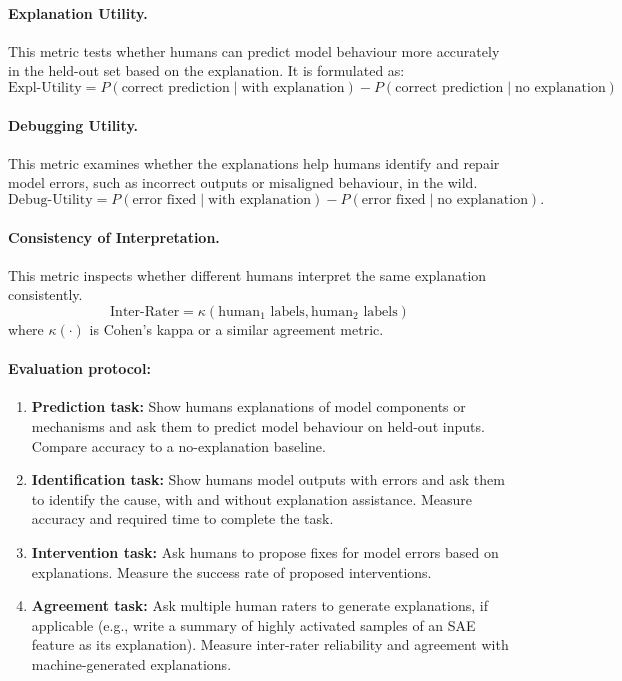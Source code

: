 \begin{definitionbox}
\paragraph{Explanation Utility.} This metric tests whether humans can predict model behaviour more accurately in the held-out set based on the explanation. It is formulated as:
\[
\text{Expl-Utility}
=
P(\text{correct prediction} \mid \text{with explanation})
-
P(\text{correct prediction} \mid \text{no explanation})
\]

\paragraph{Debugging Utility.} This metric examines whether the explanations help humans identify and repair model errors, such as incorrect outputs or misaligned behaviour, in the wild.
\[
\text{Debug-Utility}
=
P(\text{error fixed}\mid\text{with explanation})
-
P(\text{error fixed}\mid\text{no explanation}).
\]

\paragraph{Consistency of Interpretation.} This metric inspects whether different humans interpret the same explanation consistently.
\[
\text{Inter-Rater} = \kappa(\text{human}_1 \text{ labels}, \text{human}_2 \text{ labels})
\]
where $\kappa(\cdot)$ is Cohen’s kappa or a similar agreement metric.
\end{definitionbox}

\paragraph{Evaluation protocol:}
\begin{enumerate}
\item \textbf{Prediction task:} Show humans explanations of model components or mechanisms and ask them to predict model behaviour on held-out inputs. Compare accuracy to a no-explanation baseline.
\item \textbf{Identification task:} Show humans model outputs with errors and ask them to identify the cause, with and without explanation assistance. Measure accuracy and required time to complete the task.
\item \textbf{Intervention task:} Ask humans to propose fixes for model errors based on explanations. Measure the success rate of proposed interventions.
\item \textbf{Agreement task:} Ask multiple human raters to generate explanations, if applicable (e.g., write a summary of highly activated samples of an SAE feature as its explanation). Measure inter-rater reliability and agreement with machine-generated explanations.
\end{enumerate}

